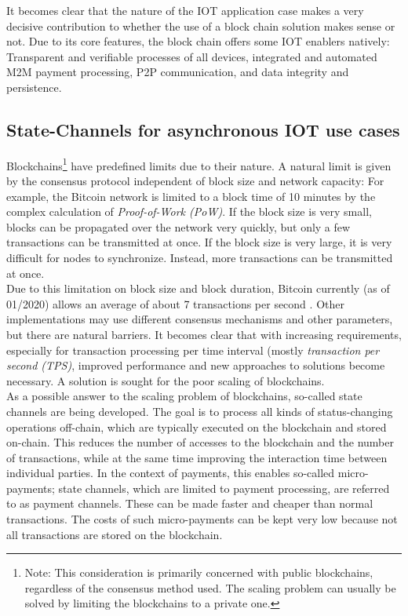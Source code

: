 \documentclass[conference]{IEEEtran}
\begin{document}
It becomes clear that the nature of the IOT application case makes a very decisive contribution to whether the use of a block chain solution makes sense or not. Due to its core features, the block chain offers some IOT enablers natively: Transparent and verifiable processes of all devices, integrated and automated M2M payment processing, P2P communication, and data integrity and persistence.

\subsection{State-Channels for asynchronous IOT use cases}
Blockchains\footnote{Note: This consideration is primarily concerned with public blockchains, regardless of the consensus method used. The scaling problem can usually be solved by limiting the blockchains to a private one.} have predefined limits due to their nature. A natural limit is given by the consensus protocol independent of block size and network capacity: For example, the Bitcoin network is limited to a block time of 10 minutes by the complex calculation of \textit{Proof-of-Work (PoW)}. If the block size is very small, blocks can be propagated over the network very quickly, but only a few transactions can be transmitted at once. If the block size is very large, it is very difficult for nodes to synchronize. Instead, more transactions can be transmitted at once.\\
Due to this limitation on block size and block duration, Bitcoin currently (as of 01/2020) allows an average of about 7 transactions per second \cite{Macdonald2017}. Other implementations may use different consensus mechanisms and other parameters, but there are natural barriers. It becomes clear that with increasing requirements, especially for transaction processing per time interval (mostly \textit{transaction per second (TPS)}, improved performance and new approaches to solutions become necessary. A solution is sought for the poor scaling of blockchains. \cite{Macdonald2017}\\
As a possible answer to the scaling problem of blockchains, so-called state channels are being developed. The goal is to process all kinds of status-changing operations off-chain, which are typically executed on the blockchain and stored on-chain. This reduces the number of accesses to the blockchain and the number of transactions, while at the same time improving the interaction time between individual parties. In the context of payments, this enables so-called micro-payments; state channels, which are limited to payment processing, are referred to as payment channels. These can be made faster and cheaper than normal transactions. The costs of such micro-payments can be kept very low because not all transactions are stored on the blockchain. \cite{Coleman2018}\\
\end{document}
